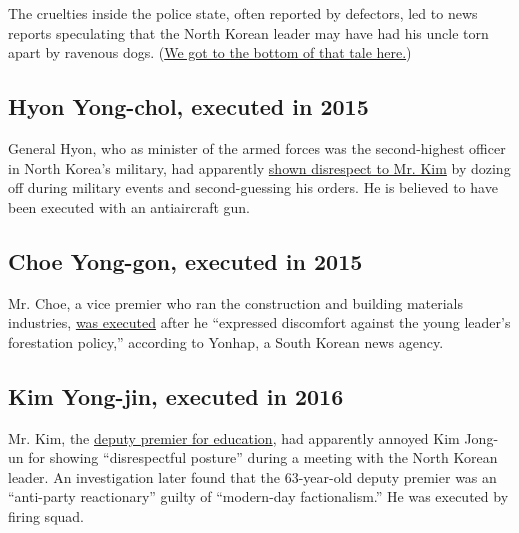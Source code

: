 The cruelties inside the police state, often reported by defectors, led
to news reports speculating that the North Korean leader may have had
his uncle torn apart by ravenous dogs.
(\href{https://thelede.blogs.nytimes.com/2014/01/03/inside-the-tale-of-north-korea-execution-by-ravenous-dog/}{We
got to the bottom of that tale here.})

\hypertarget{hyon-yong-chol-executed-in-2015}{%
\subsection{\texorpdfstring{\textbf{Hyon Yong-chol, executed in
2015}}{Hyon Yong-chol, executed in 2015}}\label{hyon-yong-chol-executed-in-2015}}

General Hyon, who as minister of the armed forces was the second-highest
officer in North Korea's military, had apparently
\href{https://www.nytimes.com/2015/05/13/world/asia/north-korea-said-to-execute-a-top-official.html}{shown
disrespect to Mr. Kim} by dozing off during military events and
second-guessing his orders. He is believed to have been executed with an
antiaircraft gun.

\hypertarget{choe-yong-gon-executed-in-2015}{%
\subsection{\texorpdfstring{\textbf{Choe Yong-gon, executed in
2015}}{Choe Yong-gon, executed in 2015}}\label{choe-yong-gon-executed-in-2015}}

Mr. Choe, a vice premier who ran the construction and building materials
industries, \href{http://www.bbc.com/news/world-asia-33882799}{was
executed} after he ``expressed discomfort against the young leader's
forestation policy,'' according to Yonhap, a South Korean news agency.

\hypertarget{kim-yong-jin-executed-in-2016}{%
\subsection{\texorpdfstring{\textbf{Kim Yong-jin, executed in
2016}}{Kim Yong-jin, executed in 2016}}\label{kim-yong-jin-executed-in-2016}}

Mr. Kim, the
\href{https://www.nytimes.com/2016/09/01/world/asia/north-korea-executes-deputy-premier.html}{deputy
premier for education}, had apparently annoyed Kim Jong-un for showing
``disrespectful posture'' during a meeting with the North Korean leader.
An investigation later found that the 63-year-old deputy premier was an
``anti-party reactionary'' guilty of ``modern-day factionalism.'' He was
executed by firing squad.


